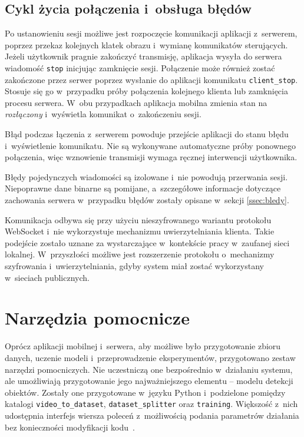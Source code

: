 \subsection{Cykl życia połączenia i~obsługa błędów}

Po ustanowieniu sesji możliwe jest rozpoczęcie komunikacji aplikacji z~serwerem, poprzez przekaz kolejnych klatek obrazu i~wymianę komunikatów sterujących. Jeżeli użytkownik pragnie zakończyć transmisję, aplikacja wysyła do serwera wiadomość \texttt{stop} inicjując zamknięcie sesji. Połączenie może również zostać zakończone przez serwer poprzez wysłanie do aplikacji komunikatu \texttt{client\_stop}. Stosuje się go w~przypadku próby połączenia kolejnego klienta lub zamknięcia procesu serwera. W~obu przypadkach aplikacja mobilna zmienia stan na \textit{rozłączony} i~wyświetla komunikat o~zakończeniu sesji.

Błąd podczas łączenia z~serwerem powoduje przejście aplikacji do stanu błędu i~wyświetlenie komunikatu. Nie są wykonywane automatyczne próby ponownego połączenia, więc wznowienie transmisji wymaga ręcznej interwencji użytkownika.

Błędy pojedynczych wiadomości są izolowane i~nie powodują przerwania sesji. Niepoprawne dane binarne są pomijane, a~szczegółowe informacje dotyczące zachowania serwera w~przypadku błędów zostały opisane w~sekcji \ref{ssec:bledy}.

Komunikacja odbywa się przy użyciu nieszyfrowanego wariantu protokołu WebSocket i~nie wykorzystuje mechanizmu uwierzytelniania klienta. Takie podejście zostało uznane za wystarczające w~kontekście pracy w~zaufanej sieci lokalnej. W~przyszłości możliwe jest rozszerzenie protokołu o~mechanizmy szyfrowania i~uwierzytelniania, gdyby system miał zostać wykorzystany w~sieciach publicznych.

\section{Narzędzia pomocnicze}

Oprócz aplikacji mobilnej i~serwera, aby możliwe było przygotowanie zbioru danych, uczenie modeli i~przeprowadzenie eksperymentów, przygotowano zestaw narzędzi pomocniczych. Nie uczestniczą one bezpośrednio w~działaniu systemu, ale umożliwiają przygotowanie jego najważniejszego elementu -- modelu detekcji obiektów. Zostały one przygotowane w~języku Python i~podzielone pomiędzy katalogi \texttt{video\_to\_dataset}, \texttt{dataset\_splitter} oraz \texttt{training}. Większość z~nich udostępnia interfejs wiersza poleceń z~możliwością podania parametrów działania bez konieczności modyfikacji kodu~.

